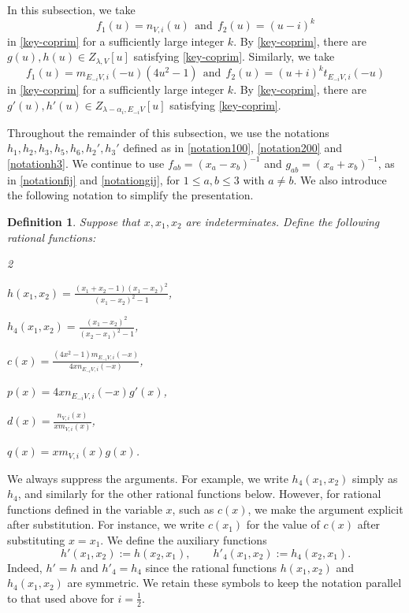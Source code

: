 \documentclass[a4,10pt]{amsart}
\numberwithin{equation}{section}
\newtheorem{Defn}[Theorem]{Definition}
\theoremstyle{definition}
\begin{document}
In this subsection, we take $$f_1(u)= n_{V, i}(u) \ \  \text{and} \ \  f_2(u)= (u-i)^k$$  in \eqref{key-coprim}  for a sufficiently large integer $k$. By \eqref{key-coprim}, there are $g(u), h(u)\in Z_{\lambda, V}[u]$ satisfying \eqref{key-coprim}. Similarly, we take 
$$f_1(u)= m_{E_{-i}V, i} (-u) (4u^2-1) \ \  \text{and}\ \  f_2(u)= (u+i)^kt_{E_{-i}V,i}(-u) $$  in \eqref{key-coprim}  for a sufficiently large integer $k$.  By \eqref{key-coprim}, there are $g'(u), h'(u)\in Z_{\lambda-\alpha_i, E_{-i}V}[u]$ satisfying \eqref{key-coprim}.

Throughout the remainder of  this subsection, we  use the notations  $h_1, h_2, h_3, h_5, h_6, h_2', h_3'$  defined as  in \eqref{notation100}, \eqref{notation200} and \eqref{notationh3}.
We continue to use $f_{ab}=(x_a-x_b)^{-1}$ and $g_{ab}=(x_a+x_b)^{-1}$, as in  \eqref{notationfij} and \eqref{notationgij}, for $1\le a,b\le 3$ with $a\neq b$. 
We also introduce   the following notation  to simplify the presentation. 



 \begin{Defn}\label{rationalffj} Suppose that $x, x_1, x_2$ are indeterminates. Define the following  rational functions:  
 \begin{multicols}{2}
\item [(1)] $h(x_1,x_2)=\frac{(x_1+x_2-1)(x_1-x_2)^2}{(x_1-x_2)^2-1}$, 
\item [(2)]  $h_4(x_1,x_2)=\frac{(x_1-x_2)^2} {(x_2-x_1)^2-1}$,
\item[(3)]   $c(x)=\frac{(4x^2-1)m_{E_{-i}V,i}(-x)}{4xn_{E_{-i}V,i}(-x)}$, \item [(4)]  $p(x)=4xn_{E_{-i}V,i}(-x)g'(x)$, \item [(5)] $d(x)=\frac{n_{V,i}(x)}{xm_{V,i}(x)}$, \item[(6)]  $q(x)=xm_{V,i}(x)g(x)$.
\end{multicols}\end{Defn} 

We always suppress the arguments. 
For example, we write
$h_4(x_1,x_2)$ simply as $h_4$,
and similarly for the other rational functions below. However, for rational functions defined in the variable $x$,
such as $c(x)$, we  make the argument explicit after substitution.
For instance, we write $c(x_1)$ for the value of $c(x)$ after substituting  $x=x_1$.
We define the auxiliary functions
\[
h'(x_1,x_2):=h(x_2,x_1),\qquad h'_4(x_1,x_2):=h_4(x_2,x_1).
\]
Indeed,   $h'=h$ and $h'_4=h_4$ since    the rational functions $h(x_1, x_2)$ and $h_4(x_1, x_2)$ are symmetric. We retain these symbols to keep the notation parallel to that used above  for $i=\frac12$.
\end{document}
